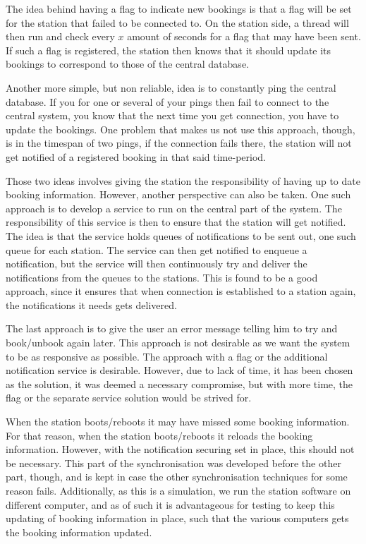 \begin{description}[style=nextline]
	The idea behind having a flag to indicate new bookings is that a flag will be set for the station that failed to be connected to.
	On the station side, a thread will then run and check every $x$ amount of seconds for a flag that may have been sent.
	If such a flag is registered, the station then knows that it should update its bookings to correspond to those of the central database.
	
	Another more simple, but non reliable, idea is to constantly ping the central database.
	If you for one or several of your pings then fail to connect to the central system, you know that the next time you get connection, you have to update the bookings.
	One problem that makes us not use this approach, though, is in the timespan of two pings, if the connection fails there, the station will not get notified of a registered booking in that said time-period.
	
	Those two ideas involves giving the station the responsibility of having up to date booking information.
	However, another perspective can also be taken.
	One such approach is to develop a service to run on the central part of the system.
	The responsibility of this service is then to ensure that the station will get notified.
	The idea is that the service holds queues of notifications to be sent out, one such queue for each station.
	The service can then get notified to enqueue a notification, but the service will then continuously try and deliver the notifications from the queues to the stations. 
	This is found to be a good approach, since it ensures that when connection is established to a station again, the notifications it needs gets delivered.
	
	The last approach is to give the user an error message telling him to try and book/unbook again later.
	This approach is not desirable as we want the system to be as responsive as possible.
	The approach with a flag or the additional notification service is desirable.
	However, due to lack of time, it has been chosen as the solution, it was deemed a necessary compromise, but with more time, the flag or the separate service solution would be strived for.
	 
	
	\item[Station boot/reboot]
	When the station boots/reboots it may have missed some booking information.
	For that reason, when the station boots/reboots it reloads the booking information.
	However, with the notification securing set in place, this should not be necessary.
	This part of the synchronisation was developed before the other part, though, and is kept in case the other synchronisation techniques for some reason fails.
	Additionally, as this is a simulation, we run the station software on different computer, and as of such it is advantageous for testing to keep this updating of booking information in place, such that the various computers gets the booking information updated.
	

\end{description}
